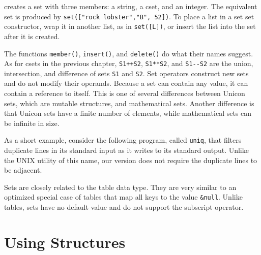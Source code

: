 
\noindent
creates a set with three members: a string, a cset, and an integer. The
equivalent set is produced by
\texttt{set(["rock lobster","B", 52])}. To place a list in a set
set constructor, wrap it in another list, as in \texttt{set([L])},
or insert the list into the set after it is created.

The functions \texttt{member()},
\texttt{insert()}, and
\texttt{delete()} do what their names suggest. As
for csets in the previous chapter, \texttt{S1++S2}, \texttt{S1**S2},
and \texttt{S1-{}-S2} are the union,
intersection, and difference of sets \texttt{S1} and \texttt{S2}. Set
operators construct new sets and do not modify their operands. Because
a set can contain any value, it can contain a
reference to itself. This is one of several
differences between Unicon sets, which are mutable structures, and
mathematical sets. Another difference is that Unicon sets have a finite
number of elements, while mathematical sets can be infinite in size.

As a short example, consider the following program, called
\texttt{uniq}, that filters duplicate lines in its standard input as it
writes to its standard output. Unlike the UNIX utility of this name,
our version does not require the duplicate lines to be adjacent.


Sets are closely related to the table data type. They are very similar
to an optimized special case of tables that map all keys to the value
\texttt{\&null}. Unlike tables, sets have no default value and do not
support the subscript operator.

\section{Using Structures}

